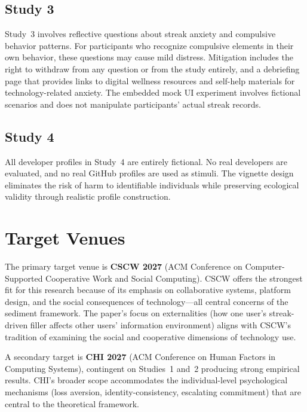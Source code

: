 \documentclass[12pt]{article}
\begin{document}
\subsection{Study 3}
\label{sec:ethics-study3}

Study~3 involves reflective questions about streak anxiety and compulsive behavior patterns. For participants who recognize compulsive elements in their own behavior, these questions may cause mild distress. Mitigation includes the right to withdraw from any question or from the study entirely, and a debriefing page that provides links to digital wellness resources and self-help materials for technology-related anxiety. The embedded mock UI experiment involves fictional scenarios and does not manipulate participants' actual streak records.

\subsection{Study 4}
\label{sec:ethics-study4}

All developer profiles in Study~4 are entirely fictional. No real developers are evaluated, and no real GitHub profiles are used as stimuli. The vignette design eliminates the risk of harm to identifiable individuals while preserving ecological validity through realistic profile construction.

\section{Target Venues}
\label{sec:target-venues}

The primary target venue is \textbf{CSCW 2027} (ACM Conference on Computer-Supported Cooperative Work and Social Computing). CSCW offers the strongest fit for this research because of its emphasis on collaborative systems, platform design, and the social consequences of technology---all central concerns of the sediment framework. The paper's focus on externalities (how one user's streak-driven filler affects other users' information environment) aligns with CSCW's tradition of examining the social and cooperative dimensions of technology use.

A secondary target is \textbf{CHI 2027} (ACM Conference on Human Factors in Computing Systems), contingent on Studies~1 and~2 producing strong empirical results. CHI's broader scope accommodates the individual-level psychological mechanisms (loss aversion, identity-consistency, escalating commitment) that are central to the theoretical framework.
\end{document}
